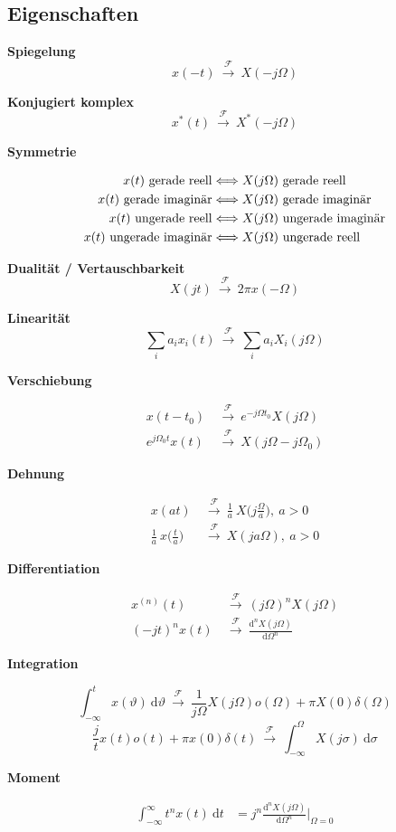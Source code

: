 \documentclass[10pt,a4paper]{article}
\newcommand{\fancyformula}[2]{
	\small
	\raggedright\sffamily\textbf{#1}
	#2
}
\newcommand{\ftransform}{
	~\xrightarrow{~\mathcal{F}~}~
}
\begin{document}
\subsection*{Eigenschaften}
\begin{multicols}{2}
	
\fancyformula{Spiegelung}{\[ x(-t)\ftransform X(-j\Omega) \]}
\fancyformula{Konjugiert komplex}{\[ x^*(t) \ftransform X^*(-j\Omega)\]}
\fancyformula{Symmetrie}{
\begin{align*}
	x(t) \textnormal{ gerade reell} &\Longleftrightarrow X(j\Omega) \textnormal{ gerade reell} \\
	x(t) \textnormal{ gerade imaginär} &\Longleftrightarrow X(j\Omega) \textnormal{ gerade imaginär} \\
	x(t) \textnormal{ ungerade reell} &\Longleftrightarrow X(j\Omega) \textnormal{ ungerade imaginär} \\
	x(t) \textnormal{ ungerade imaginär} &\Longleftrightarrow X(j\Omega) \textnormal{ ungerade reell} \\
\end{align*}
}
\fancyformula{Dualität / Vertauschbarkeit}{\[ X(jt)\ftransform 2\pi x(-\Omega) \]}
\fancyformula{Linearität}{\[ \sum_{i} a_i x_i(t) \ftransform \sum_{i} a_i X_i(j\Omega)\]}
\fancyformula{Verschiebung}{
\begin{align*}
	x(t-t_0) &\ftransform e^{-j\Omega t_0}X(j\Omega) \\
	e^{j\Omega_0t}x(t) &\ftransform X(j\Omega-j\Omega_0)
\end{align*}
}
\fancyformula{Dehnung}{
\begin{align*}
	x(at) &\ftransform \frac{1}{a}~X\bigg(j\frac{\Omega}{a}\bigg), ~ a > 0 \\
	\frac{1}{a}~x\bigg(\frac{t}{a}\bigg) &\ftransform X(ja\Omega), ~ a > 0
\end{align*}
}
\fancyformula{Differentiation}{
\begin{align*}
	x^{(n)}(t) &\ftransform (j\Omega)^nX(j\Omega) \\
	(-jt)^nx(t) &\ftransform \frac{\mathrm d^n X(j\Omega)}{\mathrm d\Omega^n}
\end{align*}	
}
\fancyformula{Integration}{
	\[\int_{-\infty}^{t}x(\vartheta) ~ \mathrm d\vartheta \ftransform \frac{1}{j\Omega} X(j\Omega) o(\Omega)+\pi X(0)\delta(\Omega)\]
	\[\frac{j}{t}x(t)o(t)+\pi x(0) \delta(t)  \ftransform \int_{-\infty}^{\Omega}X(j\sigma) ~ \mathrm d\sigma \]
}
\fancyformula{Moment}{
\begin{align*}
	\int_{-\infty}^{\infty}t^n x(t) ~ \mathrm dt &= j^n \frac{\mathrm d^nX(j\Omega)}{\mathrm d\Omega^n} \bigg|_{\Omega=0} \\

\end{align*}}
\end{multicols}
\end{document}
